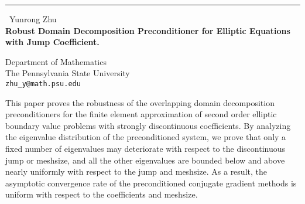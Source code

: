 \documentclass{report}
\begin{document}
\begin{center}
\rule{6in}{1pt} \
{\large Yunrong Zhu \\
{\bf Robust Domain Decomposition Preconditioner for Elliptic Equations with Jump Coefficient.
}}

Department of Mathematics \\ 
The Pennsylvania State University \\
{\tt zhu\_y@math.psu.edu}
\end{center}

This paper proves the robustness of the overlapping domain decomposition preconditioners for the finite element approximation of second order elliptic boundary value
problems with strongly discontinuous coefficients. By analyzing the
eigenvalue distribution of the preconditioned system, we prove that only a fixed number of eigenvalues may deteriorate with respect to the discontinuous jump or meshsize, and
all the other eigenvalues are bounded below and above nearly uniformly
with respect to the jump and meshsize. As a result, the asymptotic convergence rate of the preconditioned conjugate gradient methods is uniform with respect to the coefficients
and meshsize.
\end{document}
